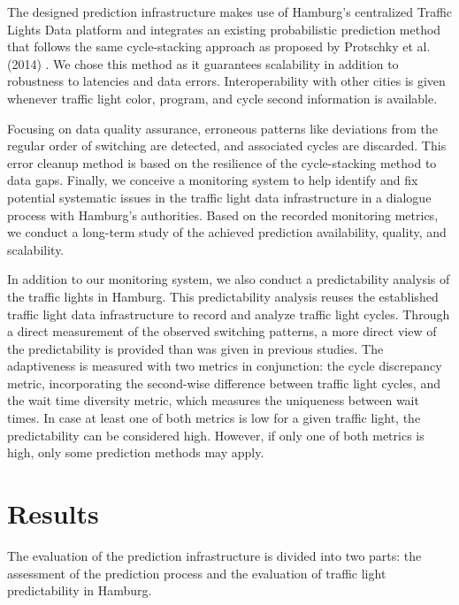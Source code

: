 \begin{Summary}
The designed prediction infrastructure makes use of Hamburg's centralized Traffic Lights Data platform and integrates an existing probabilistic prediction method  \cite{pape_untersuchung_2012} that follows the same cycle-stacking approach as proposed by Protschky et al. (2014) \cite{protschky_extensive_2014, protschky_adaptive_2014}. We chose this method as it guarantees scalability in addition to robustness to latencies and data errors. Interoperability with other cities is given whenever traffic light color, program, and cycle second information is available.

Focusing on data quality assurance, erroneous patterns like deviations from the regular order of switching are detected, and associated cycles are discarded. This error cleanup method is based on the resilience of the cycle-stacking method to data gaps. Finally, we conceive a monitoring system to help identify and fix potential systematic issues in the traffic light data infrastructure in a dialogue process with Hamburg's authorities. Based on the recorded monitoring metrics, we conduct a long-term study of the achieved prediction availability, quality, and scalability.

In addition to our monitoring system, we also conduct a predictability analysis of the traffic lights in Hamburg. This predictability analysis reuses the established traffic light data infrastructure to record and analyze traffic light cycles. Through a direct measurement of the observed switching patterns, a more direct view of the predictability is provided than was given in previous studies. The adaptiveness is measured with two metrics in conjunction: the cycle discrepancy metric, incorporating the second-wise difference between traffic light cycles, and the wait time diversity metric, which measures the uniqueness between wait times. In case at least one of both metrics is low for a given traffic light, the predictability can be considered high. However, if only one of both metrics is high, only some prediction methods may apply.
\end{Summary}

\section{Results}

The evaluation of the prediction infrastructure is divided into two parts: the assessment of the prediction process and the evaluation of traffic light predictability in Hamburg.

